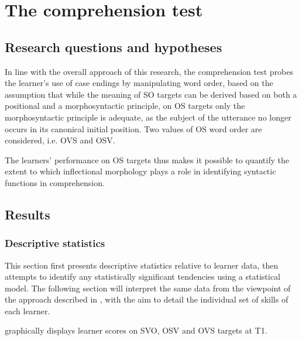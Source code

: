 \chapter{The comprehension test}

\section{Research questions and hypotheses}\label{sec:05:1}

In line with the overall approach of this research, the comprehension test probes the learner's use of case endings by manipulating word order, based on the assumption that while the meaning of SO targets can be derived based on both a positional and a morphosyntactic principle, on OS targets only the morphosyntactic principle is adequate, as the subject of the utterance no longer occurs in its canonical initial position. Two values of OS word order are considered, i.e. OVS and OSV.

The learners’ performance on OS targets thus makes it possible to quantify the extent to which inflectional morphology plays a role in identifying syntactic functions in comprehension.

\section{Results}\label{sec:05:2}
\subsection{Descriptive statistics}\label{sec:05:2.1}

This section first presents descriptive statistics relative to learner data, then attempts to identify any statistically significant tendencies using a statistical model. The following section will interpret the same data from the viewpoint of the approach described in , with the aim to detail the individual set of skills of each learner.

 graphically displays learner scores on SVO, OSV and OVS targets at T1.

